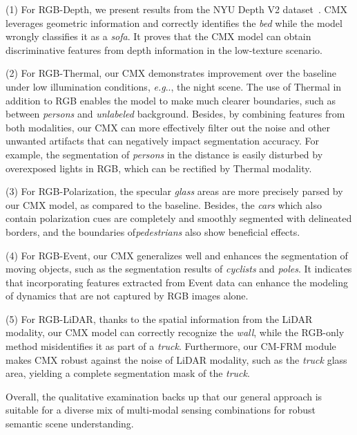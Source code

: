 \documentclass[journal]{IEEEtran}
\makeatletter
\DeclareRobustCommand\onedot{\futurelet\@let@token\@onedot}
\def\@onedot{\ifx\@let@token.\else.\null\fi\xspace}
\def\eg{\emph{e.g}\onedot} \def\Eg{\emph{E.g}\onedot}
\makeatother
\begin{document}
\begin{compactitem}
    \item[(1)] For RGB-Depth, we present results from the NYU Depth V2 dataset~\cite{silberman2012nyu_dataset}. CMX leverages geometric information and correctly identifies the \emph{bed} while the model wrongly classifies it as a \emph{sofa}. It proves that the CMX model can obtain discriminative features from depth information in the low-texture scenario.
    \item[(2)] For RGB-Thermal, our CMX demonstrates improvement over the baseline under low illumination conditions, \eg, the night scene. The use of Thermal in addition to RGB enables the model to make much clearer boundaries, such as between \emph{persons} and \emph{unlabeled} background. Besides, by combining features from both modalities, our CMX can more effectively filter out the noise and other unwanted artifacts that can negatively impact segmentation accuracy. For example, the segmentation of \emph{persons} in the distance is easily disturbed by overexposed lights in RGB, which can be rectified by Thermal modality. 
    \item[(3)] For RGB-Polarization, the specular \emph{glass} areas are more precisely parsed by our CMX model, as compared to the baseline. Besides, the \emph{cars} which also contain polarization cues are completely and smoothly segmented with delineated borders, and the boundaries of\emph{pedestrians} also show beneficial effects.
    \item[(4)] For RGB-Event, our CMX generalizes well and enhances the segmentation of moving objects, such as the segmentation results of \emph{cyclists} and \emph{poles}. It indicates that incorporating features extracted from Event data can enhance the modeling of dynamics that are not captured by RGB images alone.
    \item[(5)] For RGB-LiDAR, thanks to the spatial information from the LiDAR modality, our CMX model can correctly recognize the \emph{wall}, while the RGB-only method misidentifies it as part of a \emph{truck}. Furthermore, our CM-FRM module makes CMX robust against the noise of LiDAR modality, such as the \emph{truck} glass area, yielding a complete segmentation mask of the \emph{truck}.
\end{compactitem}

Overall, the qualitative examination backs up that our general approach is suitable for a diverse mix of multi-modal sensing combinations for robust semantic scene understanding.
\end{document}
